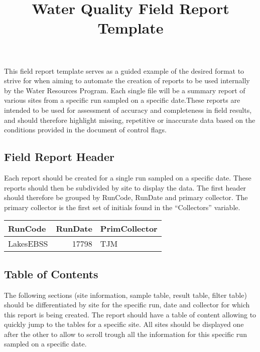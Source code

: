 \documentclass[
  letterpaper,
  DIV=11,
  numbers=noendperiod]{scrartcl}
\title{Water Quality Field Report Template}
\author{}
\date{}
\begin{document}
\maketitle
\ifdefined\Shaded\renewenvironment{Shaded}{\begin{tcolorbox}[breakable, borderline west={3pt}{0pt}{shadecolor}, enhanced, interior hidden, boxrule=0pt, frame hidden, sharp corners]}{\end{tcolorbox}}\fi

This field report template serves as a guided example of the desired
format to strive for when aiming to automate the creation of reports to
be used internally by the Water Resources Program. Each single file will
be a summary report of various sites from a specific run sampled on a
specific date.These reports are intended to be used for assessment of
accuracy and completeness in field results, and should therefore
highlight missing, repetitive or inaccurate data based on the conditions
provided in the document of control flags.

\hypertarget{field-report-header}{%
\subsection{Field Report Header}\label{field-report-header}}

Each report should be created for a single run sampled on a specific
date. These reports should then be subdivided by site to display the
data. The first header should therefore be grouped by RunCode, RunDate
and primary collector. The primary collector is the first set of
initials found in the ``Collectors'' variable.

\begin{longtable*}{lrl}
\toprule
RunCode & RunDate & PrimCollector \\ 
\midrule\addlinespace[2.5pt]
LakesEBSS & 17798 & TJM \\ 
\bottomrule
\end{longtable*}

\hypertarget{table-of-contents}{%
\subsection{Table of Contents}\label{table-of-contents}}

The following sections (site information, sample table, result table,
filter table) should be differentiated by site for the specific run,
date and collector for which this report is being created. The report
should have a table of content allowing to quickly jump to the tables
for a specific site. All sites should be displayed one after the other
to allow to scroll trough all the information for this specific run
sampled on a specific date.
\end{document}
